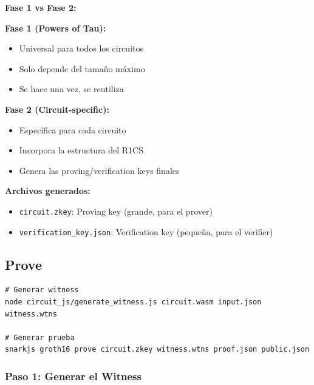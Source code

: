\documentclass[11pt,a4paper,twoside,openright]{book}
\theoremstyle{definition}
\theoremstyle{plain}
\theoremstyle{remark}
\begin{document}
\begin{mathnote}
\textbf{Fase 1 vs Fase 2:}

\textbf{Fase 1 (Powers of Tau):}
\begin{itemize}
    \item Universal para todos los circuitos
    \item Solo depende del tamaño máximo
    \item Se hace una vez, se reutiliza
\end{itemize}

\textbf{Fase 2 (Circuit-specific):}
\begin{itemize}
    \item Específica para cada circuito
    \item Incorpora la estructura del R1CS
    \item Genera las proving/verification keys finales
\end{itemize}

\textbf{Archivos generados:}
\begin{itemize}
    \item \texttt{circuit.zkey}: Proving key (grande, para el prover)
    \item \texttt{verification\_key.json}: Verification key (pequeña, para el verifier)
\end{itemize}
\end{mathnote}

\subsection{Prove}

\begin{verbatim}
# Generar witness
node circuit_js/generate_witness.js circuit.wasm input.json witness.wtns

# Generar prueba
snarkjs groth16 prove circuit.zkey witness.wtns proof.json public.json
\end{verbatim}

\subsubsection{Paso 1: Generar el Witness}
\end{document}
